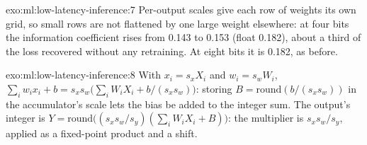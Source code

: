 \begin{solution}{exo:ml:low-latency-inference:7}
Per-output scales give each row of weights its own grid, so small rows are not flattened by one large weight elsewhere: at four
bits the information coefficient rises from 0.143 to 0.153 (float 0.182), about a third of the loss recovered without any
retraining. At eight bits it is 0.182, as before.
\end{solution}

\begin{solution}{exo:ml:low-latency-inference:8}
With $x_i = s_xX_i$ and $w_i = s_wW_i$, $\sum_iw_ix_i + b = s_xs_w\big(\sum_iW_iX_i + b/(s_xs_w)\big)$: storing $B =
\mathrm{round}(b/(s_xs_w))$ in the accumulator's scale lets the bias be added to the integer sum. The output's integer is
$Y = \mathrm{round}\big((s_xs_w/s_y)(\sum_iW_iX_i + B)\big)$: the multiplier is $s_xs_w/s_y$, applied as a fixed-point product
and a shift.
\end{solution}

